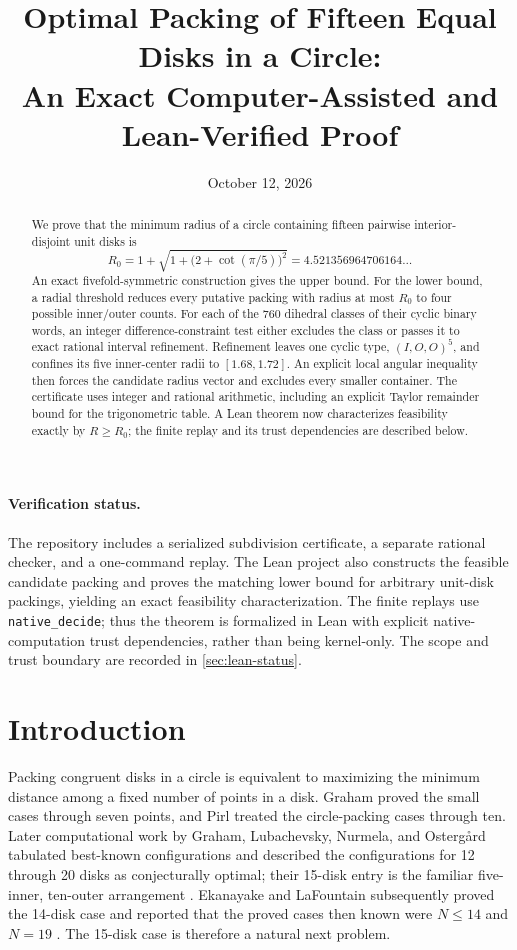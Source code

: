 \documentclass[11pt]{article}
\title{Optimal Packing of Fifteen Equal Disks in a Circle:\\An Exact Computer-Assisted and Lean-Verified Proof}
\author{}
\date{October 12, 2026}
\theoremstyle{definition}
\begin{document}
\maketitle

\begin{abstract}
We prove that the minimum radius of a circle containing fifteen pairwise interior-disjoint unit disks is
\[
  R_0=1+\sqrt{1+\bigl(2+\cot(\pi/5)\bigr)^2}
     =4.521356964706164\ldots
\]
An exact fivefold-symmetric construction gives the upper bound. For the lower bound, a radial threshold reduces every putative packing with radius at most $R_0$ to four possible inner/outer counts. For each of the 760 dihedral classes of their cyclic binary words, an integer difference-constraint test either excludes the class or passes it to exact rational interval refinement. Refinement leaves one cyclic type, $(I,O,O)^5$, and confines its five inner-center radii to $[1.68,1.72]$. An explicit local angular inequality then forces the candidate radius vector and excludes every smaller container. The certificate uses integer and rational arithmetic, including an explicit Taylor remainder bound for the trigonometric table. A Lean theorem now characterizes feasibility exactly by $R\ge R_0$; the finite replay and its trust dependencies are described below.
\end{abstract}

\paragraph{Verification status.}
The repository includes a serialized subdivision certificate, a separate rational checker, and a one-command replay. The Lean project also constructs the feasible candidate packing and proves the matching lower bound for arbitrary unit-disk packings, yielding an exact feasibility characterization. The finite replays use \texttt{native\_decide}; thus the theorem is formalized in Lean with explicit native-computation trust dependencies, rather than being kernel-only. The scope and trust boundary are recorded in \cref{sec:lean-status}.

\section{Introduction}\label{sec:intro}

Packing congruent disks in a circle is equivalent to maximizing the minimum distance among a fixed number of points in a disk. Graham proved the small cases through seven points, and Pirl treated the circle-packing cases through ten. Later computational work by Graham, Lubachevsky, Nurmela, and Ostergård tabulated best-known configurations and described the configurations for 12 through 20 disks as conjecturally optimal; their 15-disk entry is the familiar five-inner, ten-outer arrangement \cite{Graham1968,Pirl1969,GrahamEtAl1998}. Ekanayake and LaFountain subsequently proved the 14-disk case and reported that the proved cases then known were $N\le14$ and $N=19$ \cite{EF2024}. The 15-disk case is therefore a natural next problem.
\end{document}

